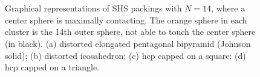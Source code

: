 \begin{figure}
    \centering
    \\
    \\
    \caption{Graphical representations of \acs{SHS} packings with $N=14$, where a
center sphere is maximally contacting. The orange sphere in each cluster is the
14th outer sphere, not able to touch the center sphere (in black).  (a)
distorted elongated pentagonal bipyramid (Johnson solid); (b) distorted
icosahedron; (c) hcp capped on a square; (d) hcp capped on a triangle.}
    \label{fig:N14}
\end{figure}


